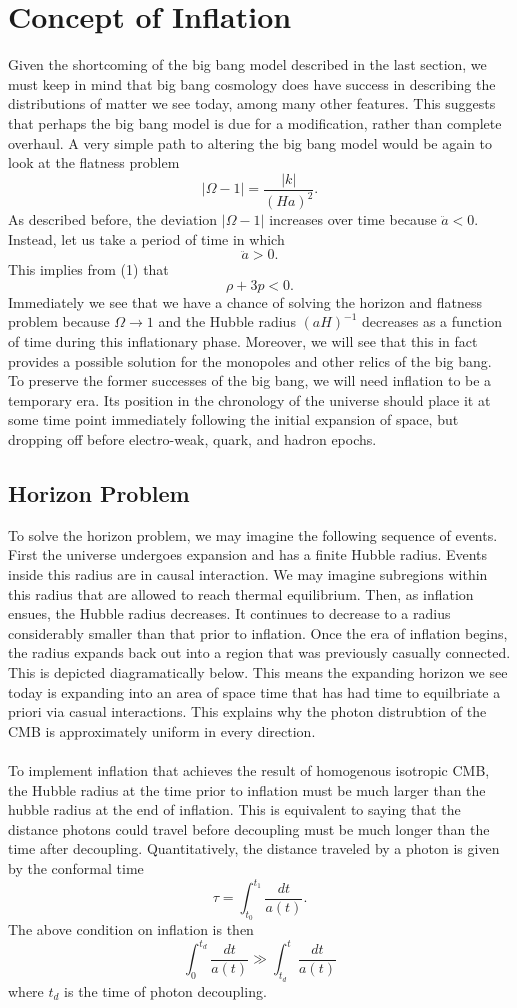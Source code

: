 \documentclass[10pt,letterpaper]{article}
\begin{document}
\section{Concept of Inflation}
Given the shortcoming of the big bang model described in the last section, we must keep in mind that big bang cosmology does have success in describing the distributions of matter we see today, among many other features. This suggests that perhaps the big bang model is due for a modification, rather than complete overhaul. A very simple path to altering the big bang model would be again to look at the flatness problem
\[
	|\Omega-1|= \frac{|k|}{(Ha)^2}.
\]
As described before, the deviation $|\Omega-1|$ increases over time because $\ddot a < 0$. Instead, let us take a period of time in which 
\[
	\ddot a >0. 
\]
This implies from (1) that
\[
	\rho+3p <0.
\]
Immediately we see that we have a chance of solving the horizon and flatness problem because $\Omega \to 1$ and the Hubble radius $(aH)^{-1}$ decreases as a function of time during this inflationary phase. Moreover, we will see that this in fact provides a possible solution for the monopoles and other relics of the big bang. To preserve the former successes of the big bang, we will need inflation to be a temporary era. Its position in the chronology of the universe should place it at some time point immediately following the initial expansion of space, but dropping off before electro-weak, quark, and hadron epochs. 

\subsection{Horizon Problem}
To solve the horizon problem, we may imagine the following sequence of events. First the universe undergoes expansion and has a finite Hubble radius. Events inside this radius are in causal interaction. We may imagine subregions within this radius that are allowed to reach thermal equilibrium. Then, as inflation ensues, the Hubble radius decreases. It continues to decrease to a radius considerably smaller than that prior to inflation. Once the era of inflation begins, the radius expands back out into a region that was previously casually connected. This is depicted diagramatically below.
\noindent This means the expanding horizon we see today is expanding into an area of space time that has had time to equilbriate a priori via casual interactions. This explains why the photon distrubtion of the CMB is approximately uniform in every direction. 
\\ \\
To implement inflation that achieves the result of homogenous isotropic CMB, the Hubble radius at the time prior to inflation must be much larger than the hubble radius at the end of inflation. This is equivalent to saying that the distance photons could travel before decoupling must be much longer than the time after decoupling. Quantitatively, the distance traveled by a photon is given by the conformal time
\[
	\tau = \int_{t_0}^{t_1} \frac{dt}{a(t)}.
\]
The above condition on inflation is then
\[
	\int_{0}^{t_d} \frac{dt}{a(t)} \gg \int_{t_d}^{t} \frac{dt}{a(t)}
\]
where $t_d$ is the time of photon decoupling. 
\end{document}

